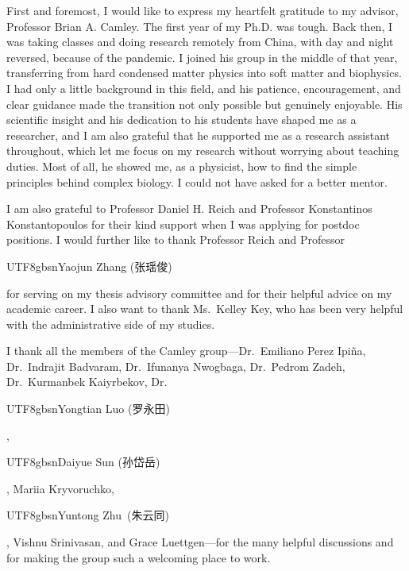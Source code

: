 {\def\ChapterFont{\LARGE\bfseries\singlespacing}}

{\large

First and foremost, I would like to express my heartfelt gratitude to my advisor, Professor Brian A. Camley.
The first year of my Ph.D. was tough. Back then, I was taking classes and doing research remotely from China, with day and night reversed, because of the pandemic.
I joined his group in the middle of that year, transferring from hard condensed matter physics into soft matter and biophysics.
I had only a little background in this field, and his patience, encouragement, and clear guidance made the transition not only possible but genuinely enjoyable.
His scientific insight and his dedication to his students have shaped me as a researcher, and I am also grateful that he supported me as a research assistant throughout, which let me focus on my research without worrying about teaching duties.
Most of all, he showed me, as a physicist, how to find the simple principles behind complex biology.
I could not have asked for a better mentor.

I am also grateful to Professor Daniel H. Reich and Professor Konstantinos Konstantopoulos for their kind support when I was applying for postdoc positions.
I would further like to thank Professor Reich and Professor \begin{CJK*}{UTF8}{gbsn}Yaojun Zhang (张瑶俊)\end{CJK*} for serving on my thesis advisory committee and for their helpful advice on my academic career.
I also want to thank Ms.~Kelley Key, who has been very helpful with the administrative side of my studies.

I thank all the members of the Camley group---Dr.~Emiliano Perez Ipi\~na, Dr.~Indrajit Badvaram, Dr.~Ifunanya Nwogbaga, Dr.~Pedrom Zadeh, Dr.~Kurmanbek Kaiyrbekov, Dr.~\begin{CJK*}{UTF8}{gbsn}Yongtian Luo (罗永田)\end{CJK*}, \begin{CJK*}{UTF8}{gbsn}Daiyue Sun (孙岱岳)\end{CJK*}, Mariia Kryvoruchko, \begin{CJK*}{UTF8}{gbsn}Yuntong Zhu~(朱云同)\end{CJK*}, Vishnu Srinivasan, and Grace Luettgen---for the many helpful discussions and for making the group such a welcoming place to work.

}
